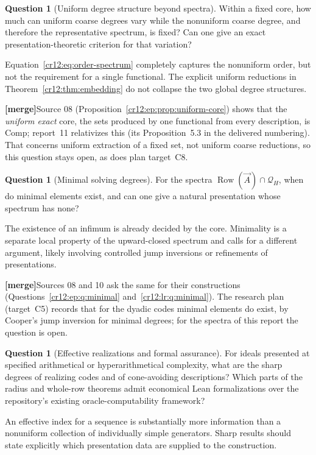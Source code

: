\documentclass[11pt,letterpaper]{article}
\theoremstyle{plain}
\theoremstyle{definition}
\newtheorem{question}[theorem]{Question}
\theoremstyle{remark}
\numberwithin{equation}{section}
\newcommand{\Row}{\operatorname{Row}}
\newcommand{\Comp}{\mathrm{Comp}}
\newcommand{\mergenote}[1]{\par\smallskip\noindent
 {\small\textsf{\textbf{[merge]}}\enspace #1}\par\smallskip}
\begin{document}
\begin{question}[Uniform degree structure beyond spectra]\label{cr12:q:uniform}
Within a fixed core, how much can uniform coarse degrees vary while the
nonuniform coarse degree, and therefore the representative spectrum, is fixed?
Can one give an exact presentation-theoretic criterion for that variation?
\end{question}
Equation~\eqref{cr12:eq:order-spectrum} completely captures the nonuniform order,
but not the requirement for a single functional. The explicit uniform
reductions in Theorem~\ref{cr12:thm:embedding} do not collapse the two global degree
structures.

\mergenote{Source 08 (Proposition~\ref{cr12:ep:prop:uniform-core}) shows that the
\emph{uniform exact} core, the sets produced by one functional from every
description, is $\Comp$; report~11 relativizes this (its Proposition~5.3 in the
delivered numbering). That concerns uniform extraction of a fixed set, not uniform
coarse reductions, so this question stays open, as does plan target~C8.}

\begin{question}[Minimal solving degrees]\label{cr12:q:minimal}
For the spectra $\Row(\vec A)\cap\mathcal Q_H$, when do minimal elements
exist, and can one give a natural presentation whose spectrum has none?
\end{question}
The existence of an infimum is already decided by the core. Minimality is a
separate local property of the upward-closed spectrum and calls for a different
argument, likely involving controlled jump inversions or refinements of
presentations.

\mergenote{Sources 08 and 10 ask the same for their constructions
(Questions~\ref{cr12:ep:q:minimal} and~\ref{cr12:lr:q:minimal}). The research plan
(target~C5) records that for the dyadic codes minimal elements do exist, by Cooper's
jump inversion for minimal degrees; for the spectra of this report the question is
open.}

\begin{question}[Effective realizations and formal assurance]\label{cr12:q:effective}
For ideals presented at specified arithmetical or hyperarithmetical complexity,
what are the sharp degrees of realizing codes and of cone-avoiding descriptions?
Which parts of the radius and whole-row theorems admit economical Lean
formalizations over the repository's existing oracle-computability framework?
\end{question}
An effective index for a sequence is substantially more information than a
nonuniform collection of individually simple generators. Sharp results should
state explicitly which presentation data are supplied to the construction.
\end{document}
